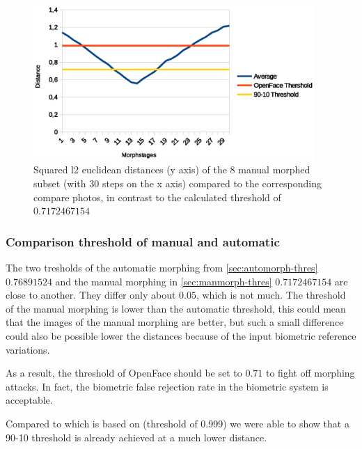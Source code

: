 \begin{figure}[htbp] 
	\centering
		\includegraphics[width=0.95\textwidth]{Resources/result-jannis-mean-90-10ODF.eps}
	\caption{Squared l2 euclidean distances (y axis) of the 8 manual morphed subset (with 30 steps on the x axis) compared to the corresponding compare photos, in contrast to the calculated threshold of $0.7172467154$} %
	\label{fig:Resultman-90-10}
\end{figure}

\subsubsection{Comparison threshold of manual and automatic}\label{sec:comp-thres}
The two tresholds of the automatic morphing from \autoref{sec:automorph-thres} $0.76891524$ and the manual morphing in \autoref{sec:manmorph-thres} $0.7172467154$ are close to another. They differ only about $0.05$, which is not much. The threshold of the manual morphing is lower than the automatic threshold, this could mean that the images of the manual morphing are better, but such a small difference could also be possible lower the distances because of the input biometric reference variations.

As a result, the threshold of OpenFace should be set to $0.71$ to fight off morphing attacks. In fact, the biometric false rejection rate in the biometric system is acceptable.

Compared to \cite{ferrara2014magic} which is based on \cite{baltruvsaitis2016openface} (threshold of 0.999) we were able to show that a 90-10 threshold is already achieved at a much lower distance.
